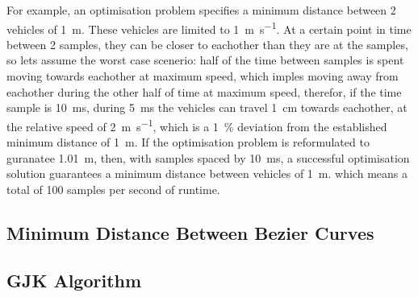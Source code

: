 \par For example, an optimisation problem specifies a minimum distance between 2 vehicles of \SI{1}{\meter}. These vehicles are limited to \SI{1}{\meter\per\second}. At a certain point in time between 2 samples, they can be closer to eachother than they are at the samples, so lets assume the worst case scenerio: half of the time between samples is spent moving towards eachother at maximum speed, which imples moving away from eachother during the other half of time at maximum speed, therefor, if the time sample is \SI{10}{\milli\second}, during \SI{5}{\milli\second} the vehicles can travel \SI{1}{\centi\meter} towards eachother, at the relative speed of \SI{2}{\meter\per\second}, which is a \SI{1}{\percent} deviation from the established minimum distance of \SI{1}{\meter}. If the optimisation problem is reformulated to guranatee \SI{1.01}{\meter}, then, with samples spaced by \SI{10}{\milli\second}, a successful optimisation solution guarantees a minimum distance between vehicles of \SI{1}{\meter}. which means a total of 100 samples per second of runtime.


\subsection{Minimum Distance Between Bezier Curves}

\par 

\subsection{GJK Algorithm}
\label{sec:gjkalg}

